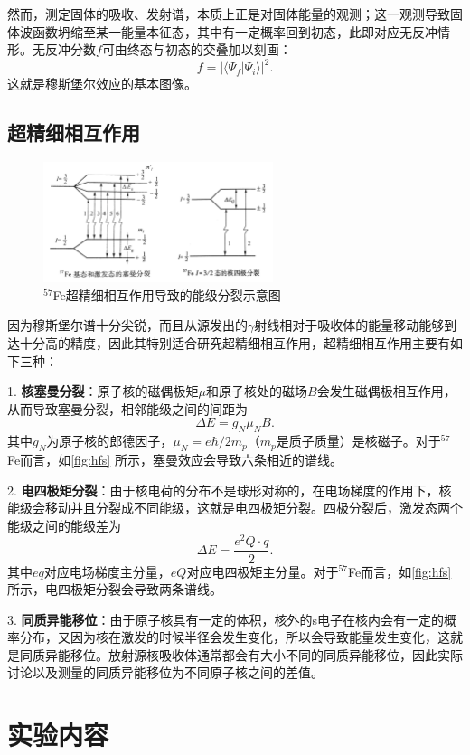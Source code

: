 \documentclass[font=default]{mpltx}
\begin{document}
然而，测定固体的吸收、发射谱，本质上正是对固体能量的观测；这一观测导致固体波函数坍缩至某一能量本征态，其中有一定概率回到初态，此即对应无反冲情形。无反冲分数$f$可由终态与初态的交叠加以刻画：$$f=|\langle \Psi_f|\Psi_i\rangle|^2.$$这就是穆斯堡尔效应的基本图像。
\subsection{超精细相互作用}
\begin{figure}
  \centering
  \includegraphics[width=0.6\textwidth]{fig/fine_struct.png}
  \caption{$^{57}$Fe超精细相互作用导致的能级分裂示意图}
  \label{fig:hfs}
\end{figure}
因为穆斯堡尔谱十分尖锐，而且从源发出的$\gamma$射线相对于吸收体的能量移动能够到达十分高的精度，因此其特别适合研究超精细相互作用，超精细相互作用主要有如下三种：

1. \textbf{核塞曼分裂}：原子核的磁偶极矩$\mu$和原子核处的磁场$B$会发生磁偶极相互作用，从而导致塞曼分裂，相邻能级之间的间距为$$\Delta E= g_N\mu_NB.$$其中$g_N$为原子核的郎德因子，$\mu_N=e\hbar/2m_p$（$m_p$是质子质量）是核磁子。对于$^{57}$Fe而言，如\autoref{fig:hfs} 所示，塞曼效应会导致六条相近的谱线。

2. \textbf{电四极矩分裂}：由于核电荷的分布不是球形对称的，在电场梯度的作用下，核能级会移动并且分裂成不同能级，这就是电四极矩分裂。四极分裂后，激发态两个能级之间的能级差为$$\Delta E = \frac{e^2Q\cdot q}{2}.$$其中$eq$对应电场梯度主分量，$eQ$对应电四极矩主分量。对于$^{57}$Fe而言，如\autoref{fig:hfs} 所示，电四极矩分裂会导致两条谱线。

3. \textbf{同质异能移位}：由于原子核具有一定的体积，核外的s电子在核内会有一定的概率分布，又因为核在激发的时候半径会发生变化，所以会导致能量发生变化，这就是同质异能移位。放射源核吸收体通常都会有大小不同的同质异能移位，因此实际讨论以及测量的同质异能移位为不同原子核之间的差值。
\section{实验内容}
\end{document}
